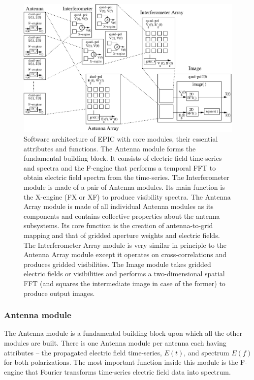 \documentclass[a4paper,fleqn,usenatbib]{../mnras}
\begin{document}
\begin{figure}
  \includegraphics[width=\linewidth]{EPIC-modules.eps}
  \caption{Software architecture of EPIC with core modules, their essential
    attributes and functions. The Antenna module forms the fundamental building 
    block. It consists of electric field time-series and spectra and the 
    F-engine that performs a temporal FFT to obtain electric field spectra from 
    the time-series. The Interferometer module is made of a pair of Antenna 
    modules. Its main function is the X-engine (FX or XF) to produce visibility 
    spectra. The Antenna Array module is made of all individual Antenna modules
    as its components and contains collective properties about the antenna 
    subsystems. Its core function is the creation of antenna-to-grid mapping and 
    that of gridded aperture weights and electric fields. The Interferometer 
    Array module is very similar in principle to the Antenna Array module 
    except it operates on cross-correlations and produces gridded visibilities.
    The Image module takes gridded electric fields or visibilities and performs
    a two-dimensional spatial FFT (and squares the intermediate image in case 
    of the former) to produce output images.}
  \label{fig:software-modules}
\end{figure}

\subsubsection{Antenna module}

The Antenna module is a fundamental building block upon which all the other 
modules are built. There is one Antenna module per antenna each having 
attributes -- the propagated electric field time-series, $E(t)$, and spectrum 
$E(f)$ for both polarizations. The most important function inside this module 
is the F-engine that Fourier transforms time-series electric field data into 
spectrum. 
\end{document}
